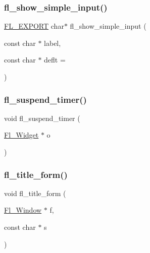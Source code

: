 \mbox{\label{forms_8_h_ad553f495075771b269eb3843e3ebd653}} 
\subsubsection{\texorpdfstring{fl\+\_\+show\+\_\+simple\+\_\+input()}{fl\_show\_simple\_input()}}
{\footnotesize\ttfamily \hyperlink{_fl___export_8_h_aa9ba29a18aee9d738370a06eeb4470fc}{F\+L\+\_\+\+E\+X\+P\+O\+RT} char$\ast$ fl\+\_\+show\+\_\+simple\+\_\+input (\begin{DoxyParamCaption}\item[{const char $\ast$}]{label,  }\item[{const char $\ast$}]{deflt = {} }\end{DoxyParamCaption})}

\mbox{\label{forms_8_h_a00555ab16662f07f144028c38270e7cc}} 
\subsubsection{\texorpdfstring{fl\+\_\+suspend\+\_\+timer()}{fl\_suspend\_timer()}}
{\footnotesize\ttfamily void fl\+\_\+suspend\+\_\+timer (\begin{DoxyParamCaption}\item[{\hyperlink{class_fl___widget}{Fl\+\_\+\+Widget} $\ast$}]{o }\end{DoxyParamCaption})\hspace{0.3cm}{\ttfamily [inline]}}

\mbox{\label{forms_8_h_a5ccbad656da3d8012a257c8fa1da3e67}} 
\subsubsection{\texorpdfstring{fl\+\_\+title\+\_\+form()}{fl\_title\_form()}}
{\footnotesize\ttfamily void fl\+\_\+title\+\_\+form (\begin{DoxyParamCaption}\item[{\hyperlink{class_fl___window}{Fl\+\_\+\+Window} $\ast$}]{f,  }\item[{const char $\ast$}]{s }\end{DoxyParamCaption})\hspace{0.3cm}{\ttfamily [inline]}}

